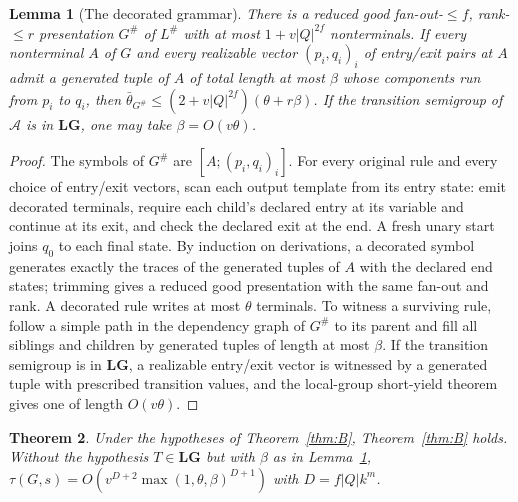 \documentclass[11pt]{article}
\numberwithin{equation}{section}
\theoremstyle{plain}
\newtheorem{theorem}{Theorem}[section]
\newtheorem{lemma}[theorem]{Lemma}
\theoremstyle{definition}
\theoremstyle{remark}
\theoremstyle{plain}
\newcommand{\LG}{\mathbf{LG}}
\newcommand{\bth}{\bar\theta}
\begin{document}
\begin{lemma}[The decorated grammar]
\label{lem:dec-grammar}
There is a reduced good fan-out-$\le f$, rank-$\le r$ presentation $G^\#$ of
$L^\#$ with at most $1+v|Q|^{2f}$ nonterminals.  If every nonterminal $A$ of $G$
and every realizable vector $(p_i,q_i)_i$ of entry/exit pairs at $A$ admit a
generated tuple of $A$ of total length at most $\beta$ whose components run from
$p_i$ to $q_i$, then $\bth_{G^\#}\le(2+v|Q|^{2f})(\theta+r\beta)$.  If the
transition semigroup of $\mathcal A$ is in $\LG$, one may take $\beta=O(v\theta)$.
\end{lemma}

\begin{proof}
The symbols of $G^\#$ are $[A;(p_i,q_i)_i]$.  For every original rule and every
choice of entry/exit vectors, scan each output template from its entry state:
emit decorated terminals, require each child's declared entry at its variable and
continue at its exit, and check the declared exit at the end.  A fresh unary
start joins $q_0$ to each final state.  By induction on derivations, a decorated
symbol generates exactly the traces of the generated tuples of $A$ with the
declared end states; trimming gives a reduced good presentation with the same
fan-out and rank.  A decorated rule writes at most $\theta$ terminals.  To
witness a surviving rule, follow a simple path in the dependency graph of
$G^\#$ to its parent and fill all siblings and children by generated tuples of
length at most $\beta$.  If the transition semigroup is in $\LG$, a realizable
entry/exit vector is witnessed by a generated tuple with prescribed transition
values, and the local-group short-yield theorem
\cite[Thm.~\textit{local-group-polydata}]{KuriyamaCompendium} gives one of length
$O(v\theta)$.
\end{proof}

\begin{theorem}
\label{thm:transfer}
Under the hypotheses of Theorem~\ref{thm:B}, Theorem~\ref{thm:B} holds.  Without
the hypothesis $T\in\LG$ but with $\beta$ as in Lemma~\ref{lem:dec-grammar},
$\tau(G,s)=O(v^{D+2}\max(1,\theta,\beta)^{D+1})$ with $D=f|Q|k^m$.
\end{theorem}
\end{document}
